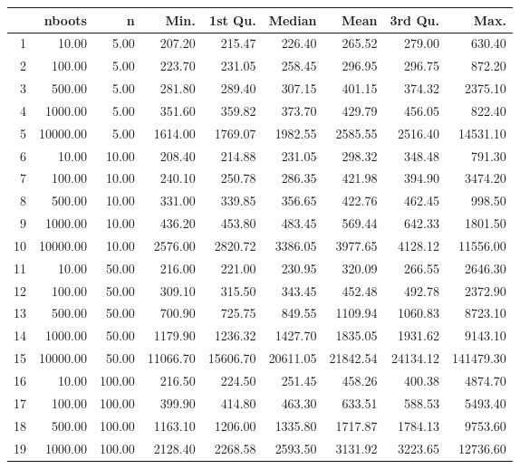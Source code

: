 \begin{table}[ht]
\centering
\begin{tabular}{rrrrrrrrr}
  \hline
 & nboots & n & Min. & 1st Qu. & Median & Mean & 3rd Qu. & Max. \\ 
  \hline
1 & 10.00 & 5.00 & 207.20 & 215.47 & 226.40 & 265.52 & 279.00 & 630.40 \\ 
  2 & 100.00 & 5.00 & 223.70 & 231.05 & 258.45 & 296.95 & 296.75 & 872.20 \\ 
  3 & 500.00 & 5.00 & 281.80 & 289.40 & 307.15 & 401.15 & 374.32 & 2375.10 \\ 
  4 & 1000.00 & 5.00 & 351.60 & 359.82 & 373.70 & 429.79 & 456.05 & 822.40 \\ 
  5 & 10000.00 & 5.00 & 1614.00 & 1769.07 & 1982.55 & 2585.55 & 2516.40 & 14531.10 \\ 
  6 & 10.00 & 10.00 & 208.40 & 214.88 & 231.05 & 298.32 & 348.48 & 791.30 \\ 
  7 & 100.00 & 10.00 & 240.10 & 250.78 & 286.35 & 421.98 & 394.90 & 3474.20 \\ 
  8 & 500.00 & 10.00 & 331.00 & 339.85 & 356.65 & 422.76 & 462.45 & 998.50 \\ 
  9 & 1000.00 & 10.00 & 436.20 & 453.80 & 483.45 & 569.44 & 642.33 & 1801.50 \\ 
  10 & 10000.00 & 10.00 & 2576.00 & 2820.72 & 3386.05 & 3977.65 & 4128.12 & 11556.00 \\ 
  11 & 10.00 & 50.00 & 216.00 & 221.00 & 230.95 & 320.09 & 266.55 & 2646.30 \\ 
  12 & 100.00 & 50.00 & 309.10 & 315.50 & 343.45 & 452.48 & 492.78 & 2372.90 \\ 
  13 & 500.00 & 50.00 & 700.90 & 725.75 & 849.55 & 1109.94 & 1060.83 & 8723.10 \\ 
  14 & 1000.00 & 50.00 & 1179.90 & 1236.32 & 1427.70 & 1835.05 & 1931.62 & 9143.10 \\ 
  15 & 10000.00 & 50.00 & 11066.70 & 15606.70 & 20611.05 & 21842.54 & 24134.12 & 141479.30 \\ 
  16 & 10.00 & 100.00 & 216.50 & 224.50 & 251.45 & 458.26 & 400.38 & 4874.70 \\ 
  17 & 100.00 & 100.00 & 399.90 & 414.80 & 463.30 & 633.51 & 588.53 & 5493.40 \\ 
  18 & 500.00 & 100.00 & 1163.10 & 1206.00 & 1335.80 & 1717.87 & 1784.13 & 9753.60 \\ 
  19 & 1000.00 & 100.00 & 2128.40 & 2268.58 & 2593.50 & 3131.92 & 3223.65 & 12736.60 \\ 

\end{tabular}
\end{table}

